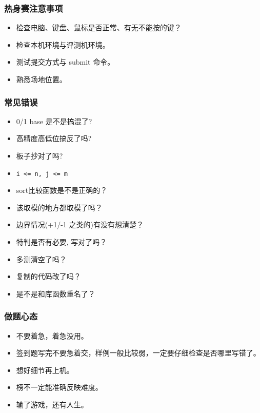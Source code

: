 \documentclass[a4paper, twoside]{article}
\begin{document}
    \subsubsection{热身赛注意事项}
    \begin{itemize}
        \item 检查电脑、键盘、鼠标是否正常、有无不能按的键？
        \item 检查本机环境与评测机环境。
        \item 测试提交方式与 submit 命令。
        \item 熟悉场地位置。
    \end{itemize}

    \subsubsection{常见错误}
    \begin{itemize}
        \item 0/1 base 是不是搞混了?
        \item 高精度高低位搞反了吗?
        \item 板子抄对了吗?
        \item \texttt{i <= n, j <= m}
        \item sort比较函数是不是正确的？
        \item 该取模的地方都取模了吗？
        \item 边界情况(+1/-1 之类的)有没有想清楚？
        \item 特判是否有必要, 写对了吗？
        \item 多测清空了吗？
        \item 复制的代码改了吗？
        \item 是不是和库函数重名了？
    \end{itemize}

    \subsubsection{做题心态}
    \begin{itemize}
        \item 不要着急，着急没用。
        \item 签到题写完不要急着交，样例一般比较弱，一定要仔细检查是否哪里写错了。
        \item 想好细节再上机。
        \item 榜不一定能准确反映难度。
        \item 输了游戏，还有人生。
    \end{itemize}
\end{document}
